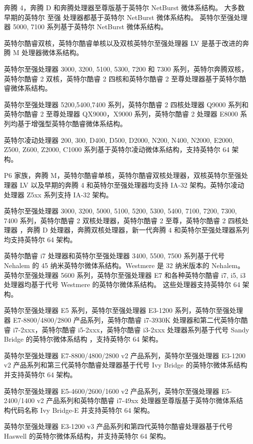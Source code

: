 奔腾 4，奔腾 D 和奔腾处理器至尊版基于英特尔 NetBurst 微体系结构。 大多数早期的英特尔 至强 处理器都基于英特尔 NetBurst 微体系结构。 英特尔至强处理器 5000, 7100 系列基于英特尔 NetBurst 微体系结构。

英特尔酷睿双核，英特尔酷睿单核以及双核英特尔至强处理器 LV 是基于改进的奔腾 M 处理器微体系结构。

英特尔至强处理器 3000, 3200, 5100, 5300, 7200 和 7300 系列，英特尔奔腾双核，英特尔酷睿 2 双核，英特尔酷睿 2 四核和英特尔酷睿 2 至尊处理器基于英特尔酷睿微体系结构。

英特尔至强处理器 5200,5400,7400 系列，英特尔酷睿 2 四核处理器 Q9000 系列和英特尔酷睿 2 至尊处理器 QX9000，X9000 系列，英特尔酷睿 2 处理器 E8000 系列均基于增强型英特尔酷睿微体系结构。

英特尔凌动处理器 200, 300, D400, D500, D2000, N200, N400, N2000, E2000, Z500, Z600, Z2000, C1000 系列基于英特尔凌动微体系结构，支持英特尔 64 架构。

P6 家族，奔腾 M，英特尔酷睿单核，英特尔酷睿双核处理器，双核英特尔至强处理器 LV 以及早期的奔腾 4 和英特尔至强处理器均支持 IA-32 架构。英特尔凌动处理器 Z5xx 系列支持 IA-32 架构。

英特尔至强处理器 3000, 3200, 5000, 5100, 5200, 5300, 5400, 7100, 7200, 7300, 7400 系列，英特尔酷睿 2 双核处理器，英特尔酷睿 2 至尊，英特尔酷睿 2 四核处理器 ，奔腾 D 处理器，奔腾双核处理器，新一代奔腾 4 和英特尔至强处理器系列均支持英特尔 64 架构。

英特尔酷睿 i7 处理器和英特尔至强处理器 3400, 5500, 7500 系列基于代号 Nehalem 的 45 纳米英特尔微体系结构。Westmere 是 32 纳米版本的 Nehalem。英特尔至强处理器 5600 系列，英特尔至强处理器 E7 和各种英特尔酷睿 i7, i5, i3 处理器均基于代号 Westmere 的英特尔微体系结构。 这些处理器支持英特尔 64 架构。

英特尔至强处理器 E5 系列，英特尔至强处理器 E3-1200 系列，英特尔至强处理器 E7-8800/4800/2800 产品系列，英特尔酷睿 i7-3930K 处理器和第二代英特尔酷睿 i7-2xxx，英特尔酷睿 i5-2xxx，英特尔酷睿 i3-2xxx 处理器系列基于代号 Sandy Bridge 的英特尔微体系结构 ，支持英特尔 64 架构。

英特尔至强处理器 E7-8800/4800/2800 v2 产品系列，英特尔至强处理器 E3-1200 v2 产品系列和第三代英特尔酷睿处理器基于代号 Ivy Bridge 的英特尔微体系结构并支持英特尔 64 架构。

英特尔至强处理器 E5-4600/2600/1600 v2 产品系列，英特尔至强处理器 E5-2400/1400 v2 产品系列和英特尔酷睿 i7-49xx 处理器至尊版基于英特尔微体系结构代码名称 Ivy Bridge-E 并支持英特尔 64 架构。

英特尔至强处理器 E3-1200 v3 产品系列和第四代英特尔酷睿处理器基于代号 Haswell 的英特尔微体系结构，并支持英特尔 64 架构。

